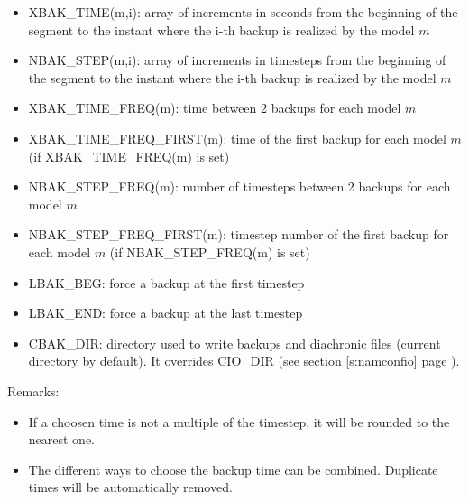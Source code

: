 \begin{itemize}
\item
{} 
XBAK\_TIME(m,i): array of increments in seconds from the beginning of the segment to the instant where the i-th backup is realized by the model $m$

\item
{} 
NBAK\_STEP(m,i): array of increments in timesteps from the beginning of the segment to the instant where the i-th backup is realized by the model $m$

\item
{} 
XBAK\_TIME\_FREQ(m): time between 2 backups for each model $m$

\item
{} 
XBAK\_TIME\_FREQ\_FIRST(m): time of the first backup for each model $m$ (if XBAK\_TIME\_FREQ(m) is set)

\item
{} 
NBAK\_STEP\_FREQ(m): number of timesteps between 2 backups for each model $m$

\item
{} 
NBAK\_STEP\_FREQ\_FIRST(m): timestep number of the first backup for each model $m$ (if NBAK\_STEP\_FREQ(m) is set)

\item
{} 
LBAK\_BEG: force a backup at the first timestep

\item
{} 
LBAK\_END: force a backup at the last timestep

\item
{} 
CBAK\_DIR: directory used to write backups and diachronic files (current directory by default).
It overrides CIO\_DIR (see section \ref{s:namconfio} page \pageref{s:namconfio}).
\end{itemize}

Remarks:
\begin{itemize}
\item If a choosen time is not a multiple of the timestep, it will be rounded to the nearest one.
\item The different ways to choose the backup time can be combined. Duplicate times will be automatically removed.
\end{itemize}

